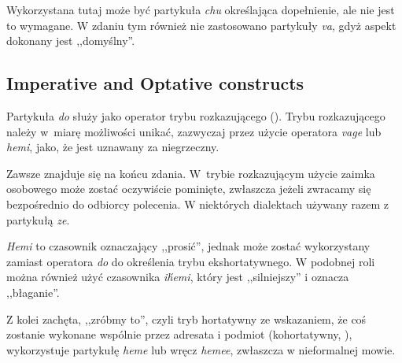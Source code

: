 Wykorzystana tutaj może być partykuła \emph{chu} określająca dopełnienie, ale
nie jest to wymagane. W zdaniu tym również nie zastosowano partykuły \emph{va},
gdyż aspekt dokonany jest ,,domyślny''.

\subsection{Imperative and Optative constructs}

Partykuła \emph{do} służy jako operator trybu rozkazującego (\Imp{}). Trybu
rozkazującego należy w~miarę możliwości unikać, zazwyczaj przez użycie operatora
\emph{vage} lub \emph{hemi}, jako, że jest uznawany za niegrzeczny.

Zawsze znajduje się na końcu zdania. W~trybie rozkazującym użycie zaimka
osobowego może zostać oczywiście pominięte, zwłaszcza jeżeli zwracamy się
bezpośrednio do odbiorcy polecenia. W niektórych dialektach używany razem z
partykułą \emph{ze}.



\emph{Hemi} to czasownik oznaczający ,,prosić'', jednak może zostać wykorzystany
zamiast operatora \emph{do} do określenia trybu ekshortatywnego. W podobnej roli
można również użyć czasownika \emph{ih́emi}, który jest ,,silniejszy'' i oznacza
,,błaganie''.




Z kolei zachęta, ,,zróbmy to'', czyli tryb hortatywny ze wskazaniem, że coś
zostanie wykonane wspólnie przez adresata i podmiot (kohortatywny, \Chr{}),
wykorzystuje partykułę \emph{heme} lub wręcz \emph{hemee}, zwłaszcza w
nieformalnej mowie.


